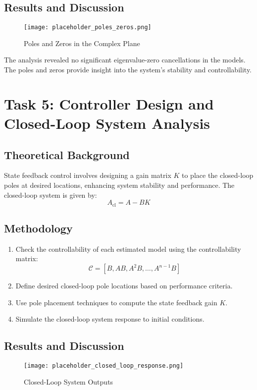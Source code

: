 \documentclass[12pt]{article}
\begin{document}
\subsection{Results and Discussion}
\begin{figure}[H]
    \centering
    \texttt{[image: placeholder\_poles\_zeros.png]}
    \caption{Poles and Zeros in the Complex Plane}
    \label{fig:poles_zeros}
\end{figure}

The analysis revealed no significant eigenvalue-zero cancellations in the models. The poles and zeros provide insight into the system's stability and controllability.

\section{Task 5: Controller Design and Closed-Loop System Analysis}
\subsection{Theoretical Background}
State feedback control involves designing a gain matrix $K$ to place the closed-loop poles at desired locations, enhancing system stability and performance. The closed-loop system is given by:
\begin{equation}
    A_{\text{cl}} = A - B K
\end{equation}

\subsection{Methodology}
\begin{enumerate}
    \item Check the controllability of each estimated model using the controllability matrix:
    \begin{equation}
        \mathcal{C} = [B, AB, A^2B, \dots, A^{n-1}B]
    \end{equation}
    \item Define desired closed-loop pole locations based on performance criteria.
    \item Use pole placement techniques to compute the state feedback gain $K$.
    \item Simulate the closed-loop system response to initial conditions.
\end{enumerate}

\subsection{Results and Discussion}
\begin{figure}[H]
    \centering
    \texttt{[image: placeholder\_closed\_loop\_response.png]}
    \caption{Closed-Loop System Outputs}
    \label{fig:closed_loop_response}
\end{figure}
\end{document}
